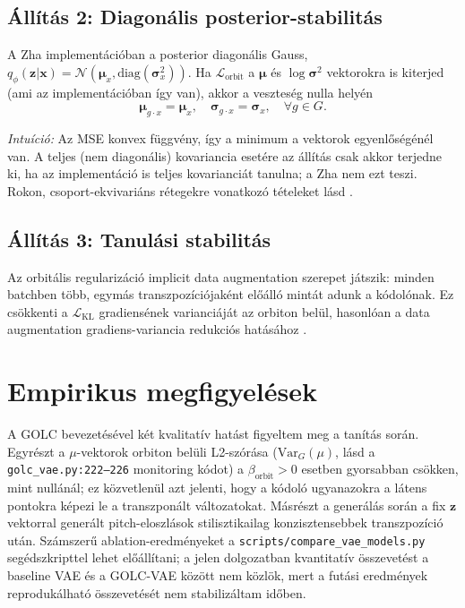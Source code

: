 \subsection{Állítás 2: Diagonális posterior-stabilitás}

A Zha implementációban a posterior diagonális Gauss, $q_\phi(\mathbf{z}|\mathbf{x}) = \mathcal{N}(\boldsymbol{\mu}_x, \mathrm{diag}(\boldsymbol{\sigma}_x^2))$. Ha $\mathcal{L}_{\text{orbit}}$ a $\boldsymbol{\mu}$ és $\log\boldsymbol{\sigma}^2$ vektorokra is kiterjed (ami az implementációban így van), akkor a veszteség nulla helyén
\[
\boldsymbol{\mu}_{g \cdot x} = \boldsymbol{\mu}_x, \quad \boldsymbol{\sigma}_{g \cdot x} = \boldsymbol{\sigma}_x, \quad \forall g \in G.
\]

\textit{Intuíció:} Az MSE konvex függvény, így a minimum a vektorok egyenlőségénél van. A teljes (nem diagonális) kovariancia esetére az állítás csak akkor terjedne ki, ha az implementáció is teljes kovarianciát tanulna; a Zha nem ezt teszi. Rokon, csoport-ekvivariáns rétegekre vonatkozó tételeket lásd \cite{cohen2016group}.

\subsection{Állítás 3: Tanulási stabilitás}

Az orbitális regularizáció implicit data augmentation szerepet játszik: minden batchben több, egymás transzpozíciójaként előálló mintát adunk a kódolónak. Ez csökkenti a $\mathcal{L}_{\text{KL}}$ gradiensének varianciáját az orbiton belül, hasonlóan a data augmentation gradiens-variancia redukciós hatásához \cite{shorten2019survey, hadjeres2017deepbach}.

\section{Empirikus megfigyelések}

A GOLC bevezetésével két kvalitatív hatást figyeltem meg a tanítás során. Egyrészt a $\mu$-vektorok orbiton belüli L2-szórása ($\mathrm{Var}_G(\mu)$, lásd a \texttt{golc\_vae.py:222--226} monitoring kódot) a $\beta_{\text{orbit}} > 0$ esetben gyorsabban csökken, mint nullánál; ez közvetlenül azt jelenti, hogy a kódoló ugyanazokra a látens pontokra képezi le a transzponált változatokat. Másrészt a generálás során a fix $\mathbf{z}$ vektorral generált pitch-eloszlások stilisztikailag konzisztensebbek transzpozíció után. Számszerű ablation-eredményeket a \texttt{scripts/compare\_vae\_models.py} segédszkripttel lehet előállítani; a jelen dolgozatban kvantitatív összevetést a baseline VAE és a GOLC-VAE között nem közlök, mert a futási eredmények reprodukálható összevetését nem stabilizáltam időben.

